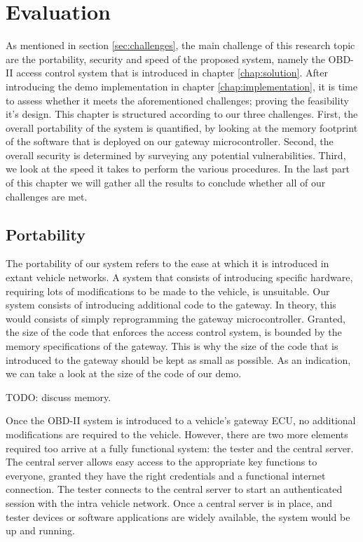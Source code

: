 
\chapter{Evaluation}
\label{chap:evaluation}

As mentioned in section \ref{sec:challenges}, the main challenge of this research topic are the portability, security and speed of the proposed system, namely the OBD-II access control system that is introduced in chapter \ref{chap:solution}. After introducing the demo implementation in chapter \ref{chap:implementation}, it is time to assess whether it meets the aforementioned challenges; proving the feasibility it's design. This chapter is structured according to our three challenges. First, the overall portability of the system is quantified, by looking at the memory footprint of the software that is deployed on our gateway microcontroller. Second, the overall security is determined by surveying any potential vulnerabilities. Third, we look at the speed it takes to perform the various procedures. In the last part of this chapter we will gather all the results to conclude whether all of our challenges are met.   

\section{Portability}
\label{sec:portability}

The portability of our system refers to the ease at which it is introduced in extant vehicle networks. A system that consists of introducing specific hardware, requiring lots of modifications to be made to the vehicle, is unsuitable. Our system consists of introducing additional code to the gateway. In theory, this would consists of simply reprogramming the gateway microcontroller. Granted, the size of the code that enforces the access control system, is bounded by the memory specifications of the gateway. This is why the size of the code that is introduced to the gateway should be kept as small as possible. As an indication, we can take a look at the size of the code of our demo. 

TODO: discuss memory.

Once the OBD-II system is introduced to a vehicle's gateway ECU, no additional modifications are required to the vehicle. However, there are two more elements required too arrive at a fully functional system: the tester and the central server. The central server allows easy access to the appropriate key functions to everyone, granted they have the right credentials and a functional internet connection. The tester connects to the central server to start an authenticated session with the intra vehicle network. Once a central server is in place, and tester devices or software applications are widely available, the system would be up and running.

